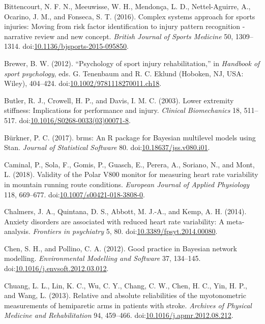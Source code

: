 \documentclass[
  english,
  man,floatsintext]{apa6}
\newlength{\cslhangindent}
\newenvironment{cslreferences}%
  {\setlength{\parindent}{0pt}%
  \everypar{\setlength{\hangindent}{\cslhangindent}}\ignorespaces}%
  {\par}
\begin{document}
\begin{cslreferences}
\leavevmode\hypertarget{ref-Bittencourt2016}{}%
Bittencourt, N. F. N., Meeuwisse, W. H., Mendonça, L. D., Nettel-Aguirre, A., Ocarino, J. M., and Fonseca, S. T. (2016). Complex systems approach for sports injuries: Moving from risk factor identification to injury pattern recognition - narrative review and new concept. \emph{British Journal of Sports Medicine} 50, 1309--1314. doi:\href{https://doi.org/10.1136/bjsports-2015-095850}{10.1136/bjsports-2015-095850}.

\leavevmode\hypertarget{ref-Brewer2012}{}%
Brewer, B. W. (2012). ``Psychology of sport injury rehabilitation,'' in \emph{Handbook of sport psychology}, eds. G. Tenenbaum and R. C. Eklund (Hoboken, NJ, USA: Wiley), 404--424. doi:\href{https://doi.org/10.1002/9781118270011.ch18}{10.1002/9781118270011.ch18}.

\leavevmode\hypertarget{ref-Butler2003}{}%
Butler, R. J., Crowell, H. P., and Davis, I. M. C. (2003). Lower extremity stiffness: Implications for performance and injury. \emph{Clinical Biomechanics} 18, 511--517. doi:\href{https://doi.org/10.1016/S0268-0033(03)00071-8}{10.1016/S0268-0033(03)00071-8}.

\leavevmode\hypertarget{ref-Burkner2017a}{}%
Bürkner, P. C. (2017). brms: An R package for Bayesian multilevel models using Stan. \emph{Journal of Statistical Software} 80. doi:\href{https://doi.org/10.18637/jss.v080.i01}{10.18637/jss.v080.i01}.

\leavevmode\hypertarget{ref-Caminal2018}{}%
Caminal, P., Sola, F., Gomis, P., Guasch, E., Perera, A., Soriano, N., and Mont, L. (2018). Validity of the Polar V800 monitor for measuring heart rate variability in mountain running route conditions. \emph{European Journal of Applied Physiology} 118, 669--677. doi:\href{https://doi.org/10.1007/s00421-018-3808-0}{10.1007/s00421-018-3808-0}.

\leavevmode\hypertarget{ref-Chalmers2014}{}%
Chalmers, J. A., Quintana, D. S., Abbott, M. J.-A., and Kemp, A. H. (2014). Anxiety disorders are associated with reduced heart rate variability: A meta-analysis. \emph{Frontiers in psychiatry} 5, 80. doi:\href{https://doi.org/10.3389/fpsyt.2014.00080}{10.3389/fpsyt.2014.00080}.

\leavevmode\hypertarget{ref-Chen2012}{}%
Chen, S. H., and Pollino, C. A. (2012). Good practice in Bayesian network modelling. \emph{Environmental Modelling and Software} 37, 134--145. doi:\href{https://doi.org/10.1016/j.envsoft.2012.03.012}{10.1016/j.envsoft.2012.03.012}.

\leavevmode\hypertarget{ref-Chuang2013}{}%
Chuang, L. L., Lin, K. C., Wu, C. Y., Chang, C. W., Chen, H. C., Yin, H. P., and Wang, L. (2013). Relative and absolute reliabilities of the myotonometric measurements of hemiparetic arms in patients with stroke. \emph{Archives of Physical Medicine and Rehabilitation} 94, 459--466. doi:\href{https://doi.org/10.1016/j.apmr.2012.08.212}{10.1016/j.apmr.2012.08.212}.


\end{cslreferences}
\end{document}
